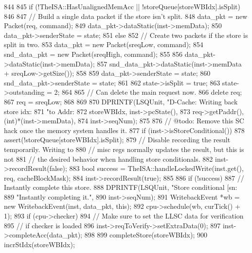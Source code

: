 \begin{DoxyCode}
{{844 
845         if (!TheISA::HasUnalignedMemAcc || !storeQueue[storeWBIdx].isSplit) {
846 
847             // Build a single data packet if the store isn't split.
848             data_pkt = new Packet(req, command);
849             data_pkt->dataStatic(inst->memData);
850             data_pkt->senderState = state;
851         } else {
852             // Create two packets if the store is split in two.
853             data_pkt = new Packet(sreqLow, command);
854             snd_data_pkt = new Packet(sreqHigh, command);
855 
856             data_pkt->dataStatic(inst->memData);
857             snd_data_pkt->dataStatic(inst->memData + sreqLow->getSize());
858 
859             data_pkt->senderState = state;
860             snd_data_pkt->senderState = state;
861 
862             state->isSplit = true;
863             state->outstanding = 2;
864 
865             // Can delete the main request now.
866             delete req;
867             req = sreqLow;
868         }
869 
870         DPRINTF(LSQUnit, "D-Cache: Writing back store idx:%
871                 "to Addr:%
872                 storeWBIdx, inst->pcState(),
873                 req->getPaddr(), (int)*(inst->memData),
874                 inst->seqNum);
875 
876         // @todo: Remove this SC hack once the memory system handles it.
877         if (inst->isStoreConditional()) {
878             assert(!storeQueue[storeWBIdx].isSplit);
879             // Disable recording the result temporarily.  Writing to
880             // misc regs normally updates the result, but this is not
881             // the desired behavior when handling store conditionals.
882             inst->recordResult(false);
883             bool success = TheISA::handleLockedWrite(inst.get(), req, 
      cacheBlockMask);
884             inst->recordResult(true);
885 
886             if (!success) {
887                 // Instantly complete this store.
888                 DPRINTF(LSQUnit, "Store conditional [sn:%
889                         "Instantly completing it.\n",
890                         inst->seqNum);
891                 WritebackEvent *wb = new WritebackEvent(inst, data_pkt, this);
892                 cpu->schedule(wb, curTick() + 1);
893                 if (cpu->checker) {
894                     // Make sure to set the LLSC data for verification
895                     // if checker is loaded
896                     inst->reqToVerify->setExtraData(0);
897                     inst->completeAcc(data_pkt);
898                 }
899                 completeStore(storeWBIdx);
900                 incrStIdx(storeWBIdx);
}}}}
\end{DoxyCode}

